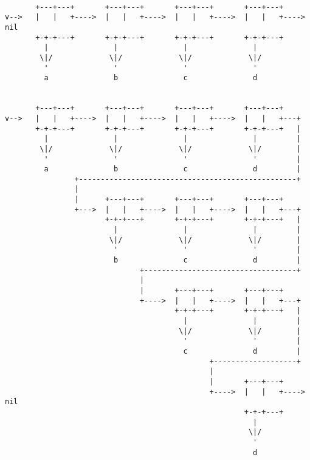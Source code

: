 \documentclass[10pt,a4paper]{article}
\begin{document}
\begin{lstlisting}

       +---+---+       +---+---+       +---+---+       +---+---+
v-->   |   |   +---->  |   |   +---->  |   |   +---->  |   |   +---->  nil
       +-+-+---+       +-+-+---+       +-+-+---+       +-+-+---+
         |               |               |               |
        \|/             \|/             \|/             \|/
         '               '               '               '
         a               b               c               d


       +---+---+       +---+---+       +---+---+       +---+---+
v-->   |   |   +---->  |   |   +---->  |   |   +---->  |   |   +---+
       +-+-+---+       +-+-+---+       +-+-+---+       +-+-+---+   |
         |               |               |               |         |
        \|/             \|/             \|/             \|/        |
         '               '               '               '         |
         a               b               c               d         |
                +--------------------------------------------------+
                |
                |      +---+---+       +---+---+       +---+---+
                +--->  |   |   +---->  |   |   +---->  |   |   +---+
                       +-+-+---+       +-+-+---+       +-+-+---+   |
                         |               |               |         |
                        \|/             \|/             \|/        |
                         '               '               '         |
                         b               c               d         |
                               +-----------------------------------+
                               |
                               |       +---+---+       +---+---+
                               +---->  |   |   +---->  |   |   +---+
                                       +-+-+---+       +-+-+---+   |
                                         |               |         |
                                        \|/             \|/        |
                                         '               '         |
                                         c               d         |
                                               +-------------------+
                                               |
                                               |       +---+---+
                                               +---->  |   |   +---->  nil
                                                       +-+-+---+
                                                         |
                                                        \|/
                                                         '
                                                         d


\end{lstlisting}
\end{document}
